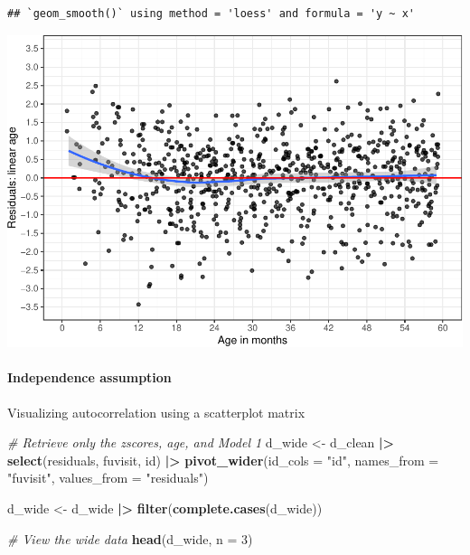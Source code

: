 \documentclass[
]{article}
\newenvironment{Shaded}{\begin{snugshade}}{\end{snugshade}}
\newcommand{\AttributeTok}[1]{\textcolor[rgb]{0.13,0.29,0.53}{#1}}
\newcommand{\CommentTok}[1]{\textcolor[rgb]{0.56,0.35,0.01}{\textit{#1}}}
\newcommand{\DecValTok}[1]{\textcolor[rgb]{0.00,0.00,0.81}{#1}}
\newcommand{\FunctionTok}[1]{\textcolor[rgb]{0.13,0.29,0.53}{\textbf{#1}}}
\newcommand{\NormalTok}[1]{#1}
\newcommand{\OtherTok}[1]{\textcolor[rgb]{0.56,0.35,0.01}{#1}}
\newcommand{\SpecialCharTok}[1]{\textcolor[rgb]{0.81,0.36,0.00}{\textbf{#1}}}
\newcommand{\StringTok}[1]{\textcolor[rgb]{0.31,0.60,0.02}{#1}}
\begin{document}
\begin{verbatim}
## `geom_smooth()` using method = 'loess' and formula = 'y ~ x'
\end{verbatim}

\includegraphics{ProblemSet3_Siyu_Zou_files/figure-latex/unnamed-chunk-7-1.pdf}

\hypertarget{independence-assumption}{%
\paragraph{Independence assumption}\label{independence-assumption}}

Visualizing autocorrelation using a scatterplot matrix

\begin{Shaded}
\begin{Highlighting}[]
\CommentTok{\# Retrieve only the zscores, age, and Model 1}
\NormalTok{d\_wide }\OtherTok{\textless{}{-}}\NormalTok{ d\_clean }\SpecialCharTok{|\textgreater{}}
  \FunctionTok{select}\NormalTok{(residuals, fuvisit, id) }\SpecialCharTok{|\textgreater{}}
  \FunctionTok{pivot\_wider}\NormalTok{(}\AttributeTok{id\_cols =} \StringTok{"id"}\NormalTok{,}
              \AttributeTok{names\_from =} \StringTok{"fuvisit"}\NormalTok{,}
              \AttributeTok{values\_from =} \StringTok{"residuals"}\NormalTok{)}

\NormalTok{d\_wide }\OtherTok{\textless{}{-}}\NormalTok{ d\_wide }\SpecialCharTok{|\textgreater{}}
  \FunctionTok{filter}\NormalTok{(}\FunctionTok{complete.cases}\NormalTok{(d\_wide))}

\CommentTok{\# View the wide data}
\FunctionTok{head}\NormalTok{(d\_wide, }\AttributeTok{n =} \DecValTok{3}\NormalTok{)}
\end{Highlighting}
\end{Shaded}
\end{document}
